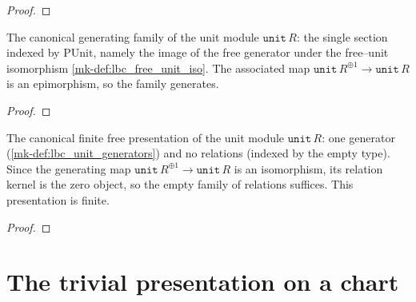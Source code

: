 \begin{proof}
  \leanok


\end{proof}

\begin{definition}\label{mk-def:lbc_unit_generators}
  \leanok

  The canonical generating family of the unit module \(\mathtt{unit}\,R\): the
  single section indexed by \(\mathrm{PUnit}\), namely the image of the free
  generator under the free–unit isomorphism \ref{mk-def:lbc_free_unit_iso}. The
  associated map \(\mathtt{unit}\,R^{\oplus 1} \to \mathtt{unit}\,R\) is an
  epimorphism, so the family generates.
\end{definition}

\begin{proof}
  \leanok


\end{proof}

\begin{definition}\label{mk-def:lbc_unit_presentation}
  \leanok

  The canonical finite free presentation of the unit module \(\mathtt{unit}\,R\):
  one generator (\ref{mk-def:lbc_unit_generators}) and no relations (indexed by the
  empty type). Since the generating map \(\mathtt{unit}\,R^{\oplus 1} \to
  \mathtt{unit}\,R\) is an isomorphism, its relation kernel is the zero object,
  so the empty family of relations suffices. This presentation is finite.
\end{definition}

\begin{proof}
  \leanok


\end{proof}

\section{The trivial presentation on a chart}
\label{mk-sec:lbc_chart_presentation}

